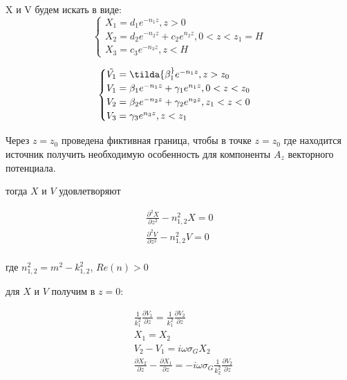 	X и V будем искать в виде:
	\begin{equation}
		\begin{cases}
			X_1 = d_1 e^{-n_1 z}, z > 0 \\
			X_2 = d_2 e^{-n_2 z} + c_2 e^{n_2 z}, 0 < z < z_1 = H \\
			X_3 = c_3 e^{-n_3 z}, z < H
			
		\end{cases}		
	\end{equation}
	
	\begin{equation}
		\begin{cases}
			\tilde{V_1} = \tilda{\beta_1^} e^{-n_1 z}, z > z_0 \\
			V_1 = \beta_1 e^{-n_1 z} + \gamma_1 e^{n_1 z}, 0 < z < z_0 \\
			V_2 = \beta_2 e^{-n_2 z} + \gamma_2 e^{n_2 z}, z_1 < z < 0 \\
			V_3 = \gamma_3 e^{n_3 z}, z < z_1
		\end{cases}
	\end{equation}
	
	Через $z = z_0$ проведена фиктивная граница, чтобы в точке $z = z_0$ где находится источник получить необходимую особенность для компоненты $A_z$
	векторного потенциала.
	
	
	тогда $X$ и $V$ удовлетворяют
	
	\begin{equation}
		\begin{aligned}
			\frac{\partial^2 X}{\partial z^2} - n_{1, 2}^2 X = 0 \\
			\frac{\partial^2 V}{\partial z^2} - n_{1, 2}^2 V = 0 \\
		\end{aligned}
	\end{equation}
	
	где $n_{1, 2}^2 = m^2 - k_{1, 2}^2$, $Re (n) > 0$
	
	
	для $X$ и $V$ получим в $z = 0$:
	
	\begin{equation}
		\begin{aligned}
			& \frac{1}{k_1^2} \frac{\partial V_1}{\partial z} = \frac{1}{k_1^2} \frac{\partial V_2}{\partial z} \\
			&X_1 = X_2 \\
			& V_2 - V_1 = i \omega \sigma_G X_2 \\
			&\frac{\partial X_2}{\partial z} - \frac{\partial X_1}{\partial z} = -i \omega \sigma_G \frac{1}{k_2^2} \frac{\partial V_2}{\partial z} \\ 
		\end{aligned}
	\end{equation}
	
